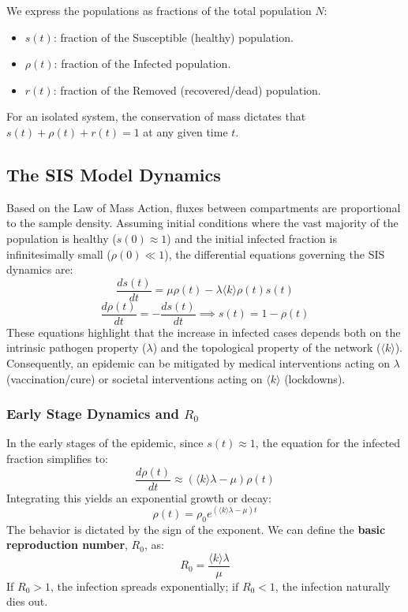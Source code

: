 We express the populations as fractions of the total population \(N\):
\begin{itemize}
    \item \(s(t)\): fraction of the Susceptible (healthy) population.
    \item \(\rho(t)\): fraction of the Infected population.
    \item \(r(t)\): fraction of the Removed (recovered/dead) population.
\end{itemize}
For an isolated system, the conservation of mass dictates that \(s(t) + \rho(t) + r(t) = 1\) at any given time \(t\).

\subsection{The SIS Model Dynamics}
\label{subsec:sis_dynamics}


Based on the Law of Mass Action, fluxes between compartments are proportional to the sample density. Assuming initial conditions where the vast majority of the population is healthy (\(s(0) \approx 1\)) and the initial infected fraction is infinitesimally small (\(\rho(0) \ll 1\)), the differential equations governing the SIS dynamics are:
\[
    \frac{ds(t)}{dt} = \mu \rho(t) - \lambda \langle k \rangle \rho(t) s(t)
\]
\[
    \frac{d\rho(t)}{dt} = -\frac{ds(t)}{dt} \implies s(t) = 1 - \rho(t)
\]
These equations highlight that the increase in infected cases depends both on the intrinsic pathogen property (\(\lambda\)) and the topological property of the network (\(\langle k \rangle\)). Consequently, an epidemic can be mitigated by medical interventions acting on \(\lambda\) (vaccination/cure) or societal interventions acting on \(\langle k \rangle\) (lockdowns).

\subsubsection{Early Stage Dynamics and \(R_0\)}

In the early stages of the epidemic, since \(s(t) \approx 1\), the equation for the infected fraction simplifies to:
\[
    \frac{d\rho(t)}{dt} \approx (\langle k \rangle \lambda - \mu) \rho(t)
\]
Integrating this yields an exponential growth or decay:
\[
    \rho(t) = \rho_0 e^{(\langle k \rangle \lambda - \mu)t}
\]
The behavior is dictated by the sign of the exponent. We can define the \textbf{basic reproduction number}, \(R_0\), as:
\[
    R_0 = \frac{\langle k \rangle \lambda}{\mu}
\]
If \(R_0 > 1\), the infection spreads exponentially; if \(R_0 < 1\), the infection naturally dies out.


